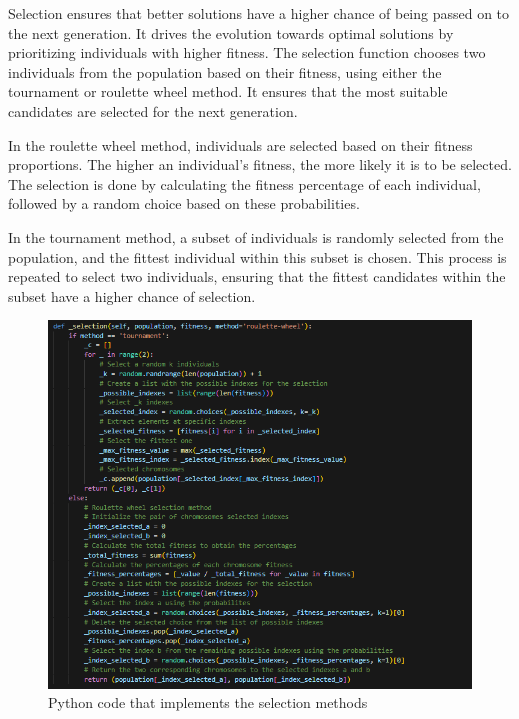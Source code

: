 \documentclass[11pt, a4paper]{article}
\begin{document}
Selection ensures that better solutions have a higher chance of being passed on to the next generation. It drives the evolution towards optimal solutions by prioritizing 
individuals with higher fitness. The selection function chooses two individuals from the population based on their fitness, using either the tournament or roulette wheel method. 
It ensures that the most suitable candidates are selected for the next generation.

\vspace{1em} In the roulette wheel method, individuals are selected based on their fitness proportions. The higher an individual's fitness, the more likely it is to be selected. 
The selection is done by calculating the fitness percentage of each individual, followed by a random choice based on these probabilities.

\vspace{1em} In the tournament method, a subset of individuals is randomly selected from the population, and the fittest individual within this subset is chosen. This process is 
repeated to select two individuals, ensuring that the fittest candidates within the subset have a higher chance of selection.

\begin{figure}[H]
    \centering
    \includegraphics[width=\textwidth]{media/selection.png}
    \caption{Python code that implements the selection methods}
    \label{fig:image_7}
\end{figure}
\end{document}
